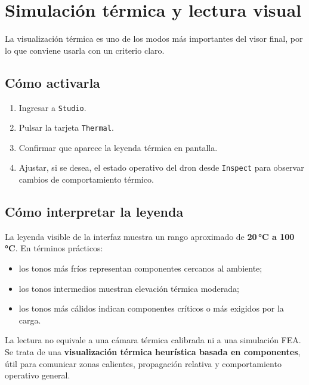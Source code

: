 \documentclass[12pt,letterpaper]{article}
\begin{document}
\section{Simulación térmica y lectura visual}
La visualización térmica es uno de los modos más importantes del visor final, por lo que conviene usarla con un criterio claro.

\subsection{Cómo activarla}
\begin{enumerate}
    \item Ingresar a \texttt{Studio}.
    \item Pulsar la tarjeta \texttt{Thermal}.
    \item Confirmar que aparece la leyenda térmica en pantalla.
    \item Ajustar, si se desea, el estado operativo del dron desde \texttt{Inspect} para observar cambios de comportamiento térmico.
\end{enumerate}

\subsection{Cómo interpretar la leyenda}
La leyenda visible de la interfaz muestra un rango aproximado de \textbf{20\,°C a 100\,°C}. En términos prácticos:
\begin{itemize}
    \item los tonos más fríos representan componentes cercanos al ambiente;
    \item los tonos intermedios muestran elevación térmica moderada;
    \item los tonos más cálidos indican componentes críticos o más exigidos por la carga.
\end{itemize}

\noindent La lectura no equivale a una cámara térmica calibrada ni a una simulación FEA. Se trata de una \textbf{visualización térmica heurística basada en componentes}, útil para comunicar zonas calientes, propagación relativa y comportamiento operativo general.
\end{document}
